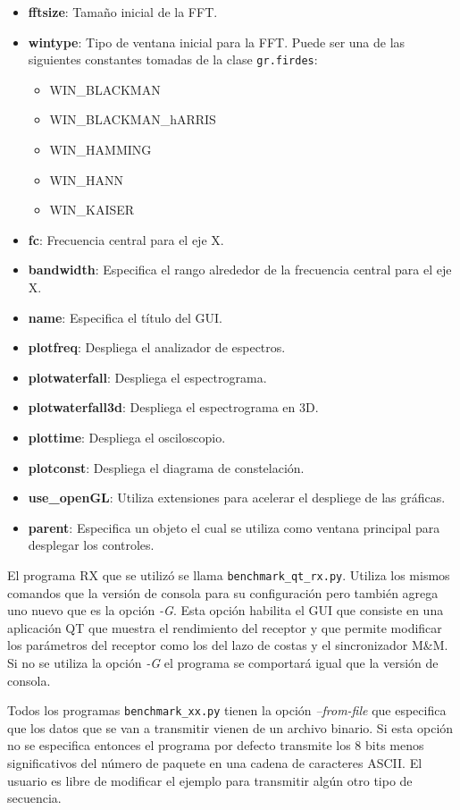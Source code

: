\begin{itemize}
  \item \textbf{fftsize}: Tama\~no inicial de la FFT.
  \item \textbf{wintype}: Tipo de ventana inicial para la FFT. Puede ser una de las siguientes
  constantes tomadas de la clase \verb|gr.firdes|:
  \begin{itemize}
    \item WIN\_BLACKMAN 
    \item WIN\_BLACKMAN\_hARRIS
    \item WIN\_HAMMING
    \item WIN\_HANN 
    \item WIN\_KAISER
  \end{itemize}
  \item \textbf{fc}: Frecuencia central para el eje X.
  \item \textbf{bandwidth}: Especifica el rango alrededor de la frecuencia central para el eje X.
  \item \textbf{name}: Especifica el t\'itulo del GUI.
  \item \textbf{plotfreq}: Despliega el analizador de espectros.
  \item \textbf{plotwaterfall}: Despliega el espectrograma.
  \item \textbf{plotwaterfall3d}: Despliega el espectrograma en 3D.
  \item \textbf{plottime}: Despliega el osciloscopio.
  \item \textbf{plotconst}: Despliega el diagrama de constelaci\'on.
  \item \textbf{use\_openGL}: Utiliza extensiones para acelerar el despliege de las gr\'aficas.
  \item \textbf{parent}: Especifica un objeto el cual se utiliza como ventana principal para
  desplegar los controles.
\end{itemize}

El programa RX que se utiliz\'o se llama \verb|benchmark_qt_rx.py|. Utiliza los mismos comandos que la
versi\'on de consola para su configuraci\'on pero tambi\'en agrega uno nuevo que es la opci\'on
\emph{-G}. Esta opci\'on habilita el GUI que consiste en una aplicaci\'on QT que muestra el rendimiento del receptor y que
permite modificar los par\'ametros del receptor como los del lazo de costas y el sincronizador M\&M. Si no se utiliza la opci\'on
\emph{-G} el programa se comportar\'a igual que la versi\'on de consola.

Todos los programas \verb|benchmark_xx.py| tienen la opci\'on \emph{--from-file} que especifica que
los datos que se van a transmitir vienen de un archivo binario. Si esta opci\'on no se especifica
entonces el programa por defecto transmite los 8 bits menos significativos del n\'umero de paquete
en una cadena de caracteres ASCII. El usuario es libre de modificar el ejemplo para transmitir
alg\'un otro tipo de secuencia.

